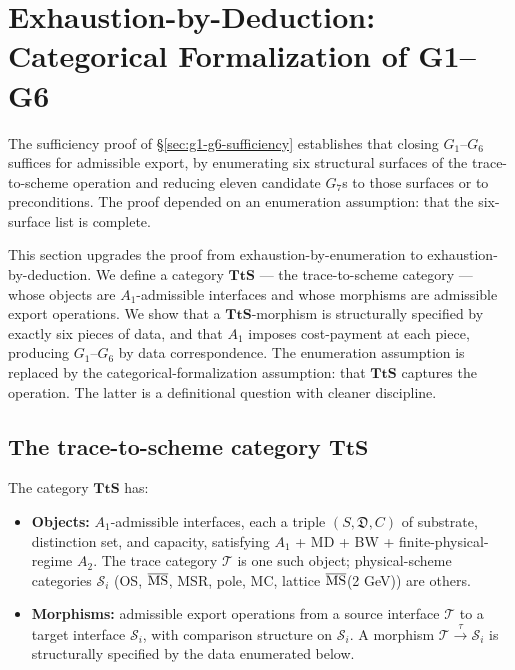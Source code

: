 \section{Exhaustion-by-Deduction: Categorical Formalization of G1--G6}
\label{sec:g1-g6-exhaustion-by-deduction}

The sufficiency proof of \S\ref{sec:g1-g6-sufficiency} establishes that closing $G_1$--$G_6$ suffices for admissible export, by enumerating six structural surfaces of the trace-to-scheme operation and reducing eleven candidate $G_7$s to those surfaces or to preconditions. The proof depended on an enumeration assumption: that the six-surface list is complete.

This section upgrades the proof from exhaustion-by-enumeration to exhaustion-by-deduction. We define a category $\mathbf{TtS}$ — the trace-to-scheme category — whose objects are $A_1$-admissible interfaces and whose morphisms are admissible export operations. We show that a $\mathbf{TtS}$-morphism is structurally specified by exactly six pieces of data, and that $A_1$ imposes cost-payment at each piece, producing $G_1$--$G_6$ by data correspondence. The enumeration assumption is replaced by the categorical-formalization assumption: that $\mathbf{TtS}$ captures the operation. The latter is a definitional question with cleaner discipline.

\subsection{The trace-to-scheme category $\mathbf{TtS}$}
\label{subsec:TtS-category}

\begin{definition}
\label{def:TtS}
The category $\mathbf{TtS}$ has:
\begin{itemize}
\item \textbf{Objects:} $A_1$-admissible interfaces, each a triple $(S, \mathfrak{D}, C)$ of substrate, distinction set, and capacity, satisfying $A_1$ + MD + BW + finite-physical-regime $A_2$. The trace category $\mathcal{T}$ is one such object; physical-scheme categories $\mathcal{S}_i$ (OS, $\overline{\rm MS}$, MSR, pole, MC, lattice $\overline{\rm MS}$(2 GeV)) are others.
\item \textbf{Morphisms:} admissible export operations from a source interface $\mathcal{T}$ to a target interface $\mathcal{S}_i$, with comparison structure on $\mathcal{S}_i$. A morphism $\mathcal{T} \xrightarrow{\tau} \mathcal{S}_i$ is structurally specified by the data enumerated below.
\end{itemize}
\end{definition}

